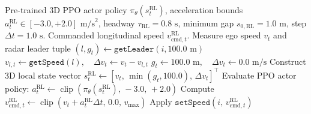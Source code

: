 \begin{algorithm}[htbp]
\caption{Standalone 3D PPO Reinforcement Learning Longitudinal Control (RL-ACC)}
\label{alg:rl}
\begin{algorithmic}[1]
\Require Pre-trained 3D PPO actor policy $\pi_\theta(s_t^{\text{RL}})$, acceleration bounds $a_t^{\text{RL}} \in [-3.0, +2.0]\text{ m/s}^2$, headway $\tau_{\text{RL}} = 0.8\text{ s}$, minimum gap $s_{0,\text{RL}} = 1.0\text{ m}$, step $\Delta t = 1.0\text{ s}$.
\Ensure Commanded longitudinal speed $v_{\text{cmd},t}^{\text{RL}}$.
    \State Measure ego speed $v_t$ and radar leader tuple $(l, g_t) \gets \texttt{getLeader}(i, 100.0\text{ m})$
        \State $v_{l,t} \gets \texttt{getSpeed}(l), \quad \Delta v_t \gets v_t - v_{l,t}$
    \Else
        \State $g_t \gets 100.0\text{ m}, \quad \Delta v_t \gets 0.0\text{ m/s}$
    \EndIf
    \State Construct 3D local state vector $s_t^{\text{RL}} \gets [v_t, \, \min(g_t, 100.0), \, \Delta v_t]^\top$
    \State Evaluate PPO actor policy: $a_t^{\text{RL}} \gets \operatorname{clip}\left(\pi_\theta(s_t^{\text{RL}}), \, -3.0, \, +2.0\right)$
    \State Compute $v_{\text{cmd},t}^{\text{RL}} \gets \operatorname{clip}\left(v_t + a_t^{\text{RL}} \Delta t, \, 0.0, \, v_{\max}\right)$
    \State Apply $\texttt{setSpeed}(i, \, v_{\text{cmd},t}^{\text{RL}})$
\EndFor
\end{algorithmic}
\end{algorithm}
